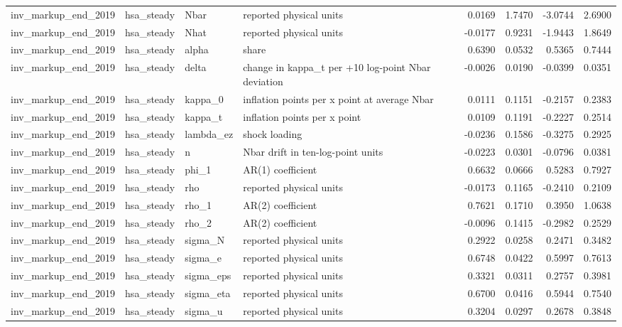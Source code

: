 \begin{tabular}{llllrrrr}
inv\_markup\_end\_2019 & hsa\_steady & Nbar & reported physical units & 0.0169 & 1.7470 & -3.0744 & 2.6900 \\
inv\_markup\_end\_2019 & hsa\_steady & Nhat & reported physical units & -0.0177 & 0.9231 & -1.9443 & 1.8649 \\
inv\_markup\_end\_2019 & hsa\_steady & alpha & share & 0.6390 & 0.0532 & 0.5365 & 0.7444 \\
inv\_markup\_end\_2019 & hsa\_steady & delta & change in kappa\_t per +10 log-point Nbar deviation & -0.0026 & 0.0190 & -0.0399 & 0.0351 \\
inv\_markup\_end\_2019 & hsa\_steady & kappa\_0 & inflation points per x point at average Nbar & 0.0111 & 0.1151 & -0.2157 & 0.2383 \\
inv\_markup\_end\_2019 & hsa\_steady & kappa\_t & inflation points per x point & 0.0109 & 0.1191 & -0.2227 & 0.2514 \\
inv\_markup\_end\_2019 & hsa\_steady & lambda\_ez & shock loading & -0.0236 & 0.1586 & -0.3275 & 0.2925 \\
inv\_markup\_end\_2019 & hsa\_steady & n & Nbar drift in ten-log-point units & -0.0223 & 0.0301 & -0.0796 & 0.0381 \\
inv\_markup\_end\_2019 & hsa\_steady & phi\_1 & AR(1) coefficient & 0.6632 & 0.0666 & 0.5283 & 0.7927 \\
inv\_markup\_end\_2019 & hsa\_steady & rho & reported physical units & -0.0173 & 0.1165 & -0.2410 & 0.2109 \\
inv\_markup\_end\_2019 & hsa\_steady & rho\_1 & AR(2) coefficient & 0.7621 & 0.1710 & 0.3950 & 1.0638 \\
inv\_markup\_end\_2019 & hsa\_steady & rho\_2 & AR(2) coefficient & -0.0096 & 0.1415 & -0.2982 & 0.2529 \\
inv\_markup\_end\_2019 & hsa\_steady & sigma\_N & reported physical units & 0.2922 & 0.0258 & 0.2471 & 0.3482 \\
inv\_markup\_end\_2019 & hsa\_steady & sigma\_e & reported physical units & 0.6748 & 0.0422 & 0.5997 & 0.7613 \\
inv\_markup\_end\_2019 & hsa\_steady & sigma\_eps & reported physical units & 0.3321 & 0.0311 & 0.2757 & 0.3981 \\
inv\_markup\_end\_2019 & hsa\_steady & sigma\_eta & reported physical units & 0.6700 & 0.0416 & 0.5944 & 0.7540 \\
inv\_markup\_end\_2019 & hsa\_steady & sigma\_u & reported physical units & 0.3204 & 0.0297 & 0.2678 & 0.3848 \\

\end{tabular}
